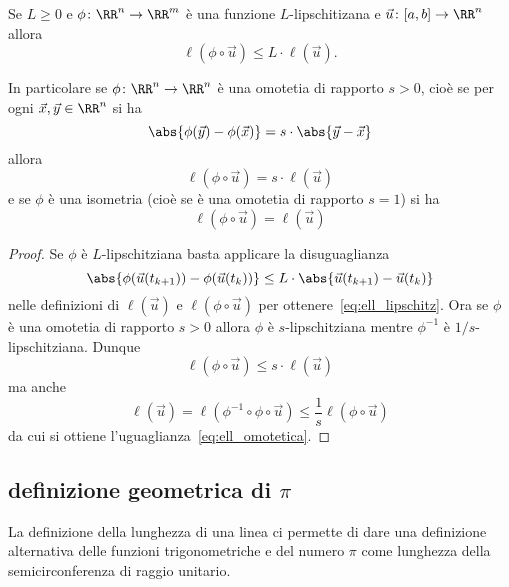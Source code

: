     \begin{lemma}
      Se $L\ge 0$ e $\phi\colon \RR^n \to \RR^m$ è una funzione 
      $L$-lipschitizana
      e $\vec u\colon [a,b]\to \RR^n$
      allora 
      \begin{equation}\label{eq:ell_lipschitz}
        \ell(\phi\circ \vec u) \le L \cdot \ell(\vec u).  
      \end{equation}
      
      In particolare se $\phi\colon\RR^n\to\RR^n$ è una omotetia di rapporto $s> 0$, 
      cioè se per ogni $\vec x, \vec y \in \RR^n$ si ha 
      \[
         \abs{\phi(\vec y) - \phi(\vec x)} = s \cdot \abs{\vec y - \vec x}
      \]
      allora 
      \begin{equation}\label{eq:ell_omotetica}
        \ell(\phi\circ \vec u) = s\cdot \ell(\vec u)  
      \end{equation}
      e se $\phi$ è una isometria (cioè se è una omotetia di rapporto $s=1$) si ha 
      \begin{equation}\label{eq:ell_isometrica}
        \ell(\phi\circ \vec u) = \ell(\vec u)  
      \end{equation}
    \end{lemma}
    \begin{proof}
    Se $\phi$ è $L$-lipschitziana basta applicare la disuguaglianza
    \[
      \abs{\phi(\vec u(t_{k+1})) - \phi(\vec u(t_k))}
      \le L\cdot \abs{\vec u(t_{k+1}) - \vec u(t_k)}  
    \]
    nelle definizioni di $\ell(\vec u)$ e $\ell(\phi\circ \vec u)$
    per ottenere~\eqref{eq:ell_lipschitz}.
    Ora se $\phi$ è una omotetia di rapporto $s>0$
    allora $\phi$ è $s$-lipschitziana mentre 
    $\phi^{-1}$ è $1/s$-lipschitziana. 
    Dunque 
    \[
       \ell(\phi\circ \vec u) \le s\cdot \ell(\vec u)
    \]
    ma anche  
    \[
      \ell(\vec u) = \ell(\phi^{-1}\circ \phi \circ \vec u)
      \le \frac 1 s \ell(\phi\circ \vec u)
    \]
    da cui si ottiene l'uguaglianza~\eqref{eq:ell_omotetica}.
    \end{proof}
    
    \subsection{definizione geometrica di $\pi$}
    
    La definizione della lunghezza di una linea 
    ci permette di dare una definizione alternativa delle 
    funzioni trigonometriche e del numero $\pi$ come lunghezza 
    della semicirconferenza di raggio unitario.
    
